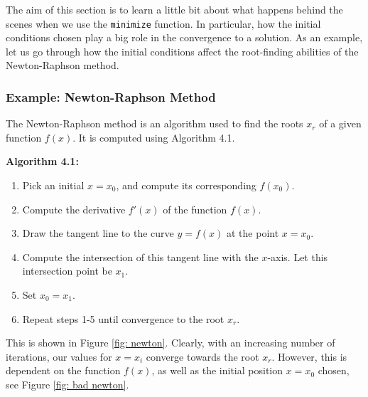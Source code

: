 \begin{flushleft}
The aim of this section is to learn a little bit about what happens behind the scenes when we use the \texttt{minimize} function. In particular, how the initial conditions chosen play a big role in the convergence to a solution. As an example, let us go through how the initial conditions affect the root-finding abilities of the Newton-Raphson method.
\end{flushleft}

\subsubsection{Example: Newton-Raphson Method}

\begin{flushleft}
The Newton-Raphson method is an algorithm used to find the roots $x_r$ of a given function $f(x)$. It is computed using Algorithm 4.1.

\vspace{3mm}

\textbf{Algorithm 4.1:}

\begin{enumerate}
    \item Pick an initial $x = x_0$, and compute its corresponding $f(x_0)$.
    \vspace{-3mm}
    \item Compute the derivative $f'(x)$ of the function $f(x)$.
    \vspace{-3mm}
    \item Draw the tangent line to the curve $y = f(x)$ at the point $x = x_0$.
    \vspace{-3mm}
    \item Compute the intersection of this tangent line with the $x$-axis. Let this intersection point be $x_1$.
    \vspace{-3mm}
    \item Set $x_0 = x_1$.
    \vspace{-3mm}
    \item Repeat steps 1-5 until convergence to the root $x_r$.
\end{enumerate}

This is shown in Figure \ref{fig: newton}. Clearly, with an increasing number of iterations, our values for $x = x_i$ converge towards the root $x_r$. However, this is dependent on the function $f(x)$, as well as the initial position $x=x_0$ chosen, see Figure \ref{fig: bad newton}. 
\end{flushleft}

